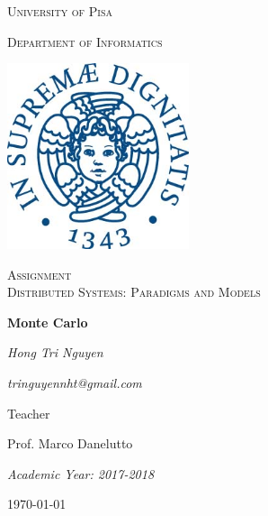 \documentclass[14pt,a4paper]{report}
\begin{document}
	\begin{titlepage}
		\centering
		{\scshape\LARGE University of Pisa \par}
		{\scshape Department of Informatics\par}
		\vspace{1.0cm}
		\includegraphics[width=0.4\textwidth]{image/Unipi_Image}\par\vspace{1cm}
		
		\vspace{0.5cm}
		{\scshape\Large Assignment\\Distributed Systems: Paradigms and Models \par}
		\vspace{1.cm}
		{\huge\bfseries Monte Carlo\par}
		\vspace{2cm}
		{\Large\itshape Hong Tri Nguyen \par}
		{\Large\itshape tringuyennht@gmail.com\par}
		\vspace{2cm}

		\vfill
		Teacher\par
		Prof. Marco Danelutto
		\vfill
		{\Large\itshape Academic Year: 2017-2018\par}
		\vfill
		{\large \today\par}

	\end{titlepage}
\end{document}
